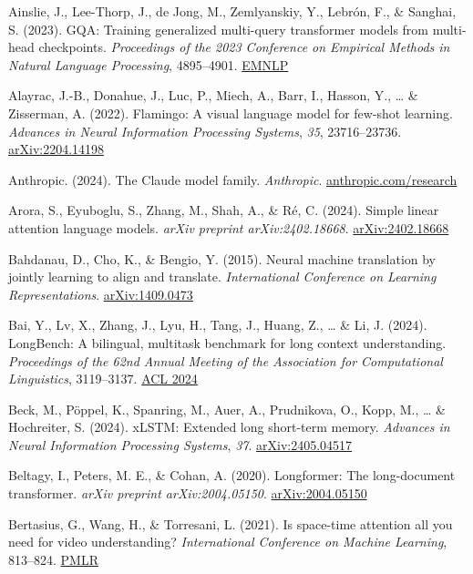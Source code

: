 \documentclass[10pt,twocolumn]{article}
\begin{document}
Ainslie, J., Lee-Thorp, J., de Jong, M., Zemlyanskiy, Y., Lebrón, F., \& Sanghai, S. (2023). GQA: Training generalized multi-query transformer models from multi-head checkpoints. \emph{Proceedings of the 2023 Conference on Empirical Methods in Natural Language Processing}, 4895--4901. \href{https://aclanthology.org/2023.emnlp-main.298}{EMNLP}

Alayrac, J.-B., Donahue, J., Luc, P., Miech, A., Barr, I., Hasson, Y., \ldots{} \& Zisserman, A. (2022). Flamingo: A visual language model for few-shot learning. \emph{Advances in Neural Information Processing Systems}, \emph{35}, 23716--23736. \href{https://arxiv.org/abs/2204.14198}{arXiv:2204.14198}

Anthropic. (2024). The Claude model family. \emph{Anthropic}. \href{https://www.anthropic.com/research}{anthropic.com/research}

Arora, S., Eyuboglu, S., Zhang, M., Shah, A., \& Ré, C. (2024). Simple linear attention language models. \emph{arXiv preprint arXiv:2402.18668}. \href{https://arxiv.org/abs/2402.18668}{arXiv:2402.18668}

Bahdanau, D., Cho, K., \& Bengio, Y. (2015). Neural machine translation by jointly learning to align and translate. \emph{International Conference on Learning Representations}. \href{https://arxiv.org/abs/1409.0473}{arXiv:1409.0473}

Bai, Y., Lv, X., Zhang, J., Lyu, H., Tang, J., Huang, Z., \ldots{} \& Li, J. (2024). LongBench: A bilingual, multitask benchmark for long context understanding. \emph{Proceedings of the 62nd Annual Meeting of the Association for Computational Linguistics}, 3119--3137. \href{https://aclanthology.org/2024.acl-long.172}{ACL 2024}

Beck, M., Pöppel, K., Spanring, M., Auer, A., Prudnikova, O., Kopp, M., \ldots{} \& Hochreiter, S. (2024). xLSTM: Extended long short-term memory. \emph{Advances in Neural Information Processing Systems}, \emph{37}. \href{https://arxiv.org/abs/2405.04517}{arXiv:2405.04517}

Beltagy, I., Peters, M. E., \& Cohan, A. (2020). Longformer: The long-document transformer. \emph{arXiv preprint arXiv:2004.05150}. \href{https://arxiv.org/abs/2004.05150}{arXiv:2004.05150}

Bertasius, G., Wang, H., \& Torresani, L. (2021). Is space-time attention all you need for video understanding? \emph{International Conference on Machine Learning}, 813--824. \href{https://proceedings.mlr.press/v139/bertasius21a.html}{PMLR}
\end{document}
